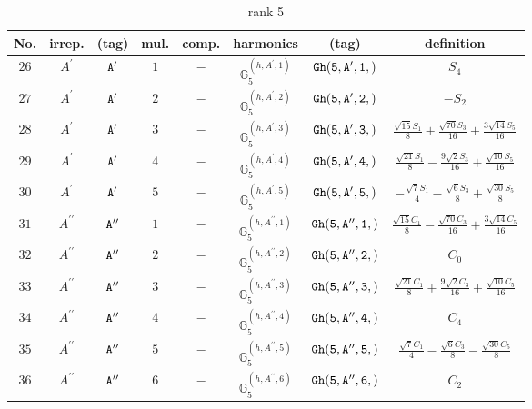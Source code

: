 \documentclass[fleqn,8pt]{jsarticle}
\begin{document}
\begin{table}[ht!]
\begin{center}
\caption{rank 5}
\renewcommand{\arraystretch}{1.3}
\begin{tabular}{cccccccc} \hline \hline
No. & irrep. & (tag) & mul. & comp. & harmonics & (tag) & definition \\ \hline
$ 26 $ & $ A^{\prime} $ & $ {\tt A'} $ & $ 1 $ & $ - $ & $ \mathbb{G}_{5}^{(h,A^{\prime},1)} $ & $ {\tt Gh(5,A',1,)} $ & $ S_{4} $ \\
$ 27 $ & $ A^{\prime} $ & $ {\tt A'} $ & $ 2 $ & $ - $ & $ \mathbb{G}_{5}^{(h,A^{\prime},2)} $ & $ {\tt Gh(5,A',2,)} $ & $ - S_{2} $ \\
$ 28 $ & $ A^{\prime} $ & $ {\tt A'} $ & $ 3 $ & $ - $ & $ \mathbb{G}_{5}^{(h,A^{\prime},3)} $ & $ {\tt Gh(5,A',3,)} $ & $ \frac{\sqrt{15} S_{1}}{8} + \frac{\sqrt{70} S_{3}}{16} + \frac{3 \sqrt{14} S_{5}}{16} $ \\
$ 29 $ & $ A^{\prime} $ & $ {\tt A'} $ & $ 4 $ & $ - $ & $ \mathbb{G}_{5}^{(h,A^{\prime},4)} $ & $ {\tt Gh(5,A',4,)} $ & $ \frac{\sqrt{21} S_{1}}{8} - \frac{9 \sqrt{2} S_{3}}{16} + \frac{\sqrt{10} S_{5}}{16} $ \\
$ 30 $ & $ A^{\prime} $ & $ {\tt A'} $ & $ 5 $ & $ - $ & $ \mathbb{G}_{5}^{(h,A^{\prime},5)} $ & $ {\tt Gh(5,A',5,)} $ & $ - \frac{\sqrt{7} S_{1}}{4} - \frac{\sqrt{6} S_{3}}{8} + \frac{\sqrt{30} S_{5}}{8} $ \\
$ 31 $ & $ A^{\prime\prime} $ & $ {\tt A''} $ & $ 1 $ & $ - $ & $ \mathbb{G}_{5}^{(h,A^{\prime\prime},1)} $ & $ {\tt Gh(5,A'',1,)} $ & $ \frac{\sqrt{15} C_{1}}{8} - \frac{\sqrt{70} C_{3}}{16} + \frac{3 \sqrt{14} C_{5}}{16} $ \\
$ 32 $ & $ A^{\prime\prime} $ & $ {\tt A''} $ & $ 2 $ & $ - $ & $ \mathbb{G}_{5}^{(h,A^{\prime\prime},2)} $ & $ {\tt Gh(5,A'',2,)} $ & $ C_{0} $ \\
$ 33 $ & $ A^{\prime\prime} $ & $ {\tt A''} $ & $ 3 $ & $ - $ & $ \mathbb{G}_{5}^{(h,A^{\prime\prime},3)} $ & $ {\tt Gh(5,A'',3,)} $ & $ \frac{\sqrt{21} C_{1}}{8} + \frac{9 \sqrt{2} C_{3}}{16} + \frac{\sqrt{10} C_{5}}{16} $ \\
$ 34 $ & $ A^{\prime\prime} $ & $ {\tt A''} $ & $ 4 $ & $ - $ & $ \mathbb{G}_{5}^{(h,A^{\prime\prime},4)} $ & $ {\tt Gh(5,A'',4,)} $ & $ C_{4} $ \\
$ 35 $ & $ A^{\prime\prime} $ & $ {\tt A''} $ & $ 5 $ & $ - $ & $ \mathbb{G}_{5}^{(h,A^{\prime\prime},5)} $ & $ {\tt Gh(5,A'',5,)} $ & $ \frac{\sqrt{7} C_{1}}{4} - \frac{\sqrt{6} C_{3}}{8} - \frac{\sqrt{30} C_{5}}{8} $ \\
$ 36 $ & $ A^{\prime\prime} $ & $ {\tt A''} $ & $ 6 $ & $ - $ & $ \mathbb{G}_{5}^{(h,A^{\prime\prime},6)} $ & $ {\tt Gh(5,A'',6,)} $ & $ C_{2} $ \\
 \hline \hline
\end{tabular}
\end{center}
\end{table}
\end{document}
